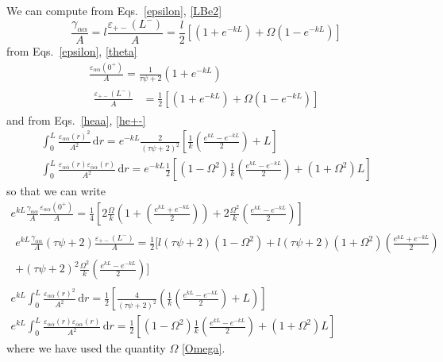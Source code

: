 \documentclass[pre,aps,superscriptaddress,nofootinbib]{revtex4}
\begin{document}
We can compute from Eqs.~\ref{epsilon}, \ref{LBe2}
\begin{equation}
\frac{\gamma_{\alpha\alpha}}{A} = l \frac{\varepsilon_{+-}(L^-)}{A} = \frac{l}{2} \left[(1 + e^{-k L}) + \Omega (1 - e^{-k L})\right]
\end{equation}
from Eqs.~\ref{epsilon}, \ref{theta}
\begin{eqnarray}
\frac{\varepsilon_{\alpha\alpha}(0^+)}{A} = \frac{1}{\tau\psi + 2}(1 + e^{-k L})\\
\begin{aligned}
\frac{\varepsilon_{+-}(L^-)}{A} &= \frac{1}{2} \left[(1 + e^{-k L}) + \Omega (1 - e^{-k L})\right]
\end{aligned}
\end{eqnarray}
and from Eqs.~\ref{heaa}, \ref{he+-}
\begin{eqnarray}
\int_0^L \frac{\varepsilon_{\alpha\alpha}(r)^2}{A^2} \, \mathrm{d}r = e^{-k L} \frac{2}{(\tau \psi + 2)^2} \left[\frac{1}{k} \left(\frac{e^{k L} - e^{- k L}}{2}\right) + L\right]\\
\int_0^L \frac{\varepsilon_{\alpha\overline{\alpha}}(r)\varepsilon_{\overline{\alpha}\alpha}(r)}{A^2} \, \mathrm{d}r = e^{-k L} \frac{1}{2} \left[(1 - \Omega^2) \frac{1}{k} \left(\frac{e^{k L} - e^{-k L}}{2}\right) + (1 + \Omega^2) L\right]
\end{eqnarray}
so that we can write
\begin{eqnarray}
e^{k L} \frac{\gamma_{\alpha\alpha}}{A} \frac{\varepsilon_{\alpha\alpha}(0^+)}{A} = \frac{1}{4} \left[2 \frac{\Omega}{k} \left(1 + \left(\frac{e^{k L} + e^{-k L}}{2}\right)\right) + 2 \frac{\Omega^2}{k} \left(\frac{e^{k L} - e^{-k L}}{2}\right)\right]\\
\begin{aligned}
e^{k L} \frac{\gamma_{\alpha\alpha}}{A} (\tau \psi + 2) \frac{\varepsilon_{+-}(L^-)}{A} = \frac{1}{2} \Bigg[l(\tau \psi + 2)(1 - \Omega^2) + l(\tau\psi + 2)(1 + \Omega^2)\left(\frac{e^{k L} + e^{-k L}}{2}\right)\\
+ (\tau \psi + 2)^2 \frac{\Omega^2}{k} \left(\frac{e^{k L} - e^{-k L}}{2}\right)\Bigg]
\end{aligned}\\
e^{k L} \int_0^L \frac{\varepsilon_{\alpha\alpha}(r)^2}{A^2} \, \mathrm{d}r = \frac{1}{2} \left[\frac{4}{(\tau\psi + 2)^2} \left(\frac{1}{k}\left(\frac{e^{k L} - e^{- k L}}{2}\right) + L\right)\right]\\
e^{k L} \int_0^L \frac{\varepsilon_{\alpha\overline{\alpha}}(r)\varepsilon_{\overline{\alpha}\alpha}(r)}{A^2} \, \mathrm{d}r = \frac{1}{2} \left[(1 - \Omega^2) \frac{1}{k}\left(\frac{e^{k L} - e^{-k L}}{2}\right) + (1 + \Omega^2) L\right]
\end{eqnarray}
where we have used the quantity $\Omega$ \eqref{Omega}.\\
\end{document}
